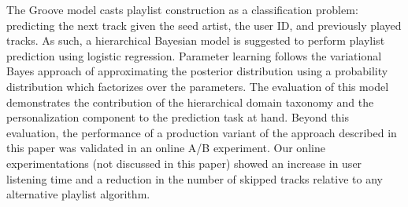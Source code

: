 The Groove model casts playlist construction as a classification problem: predicting the next track given the seed artist, the user ID, and previously played tracks. 
As such, a hierarchical Bayesian model is suggested to perform playlist prediction using logistic regression. 
Parameter learning follows the variational Bayes approach of approximating the posterior distribution using a probability distribution which factorizes over the parameters. 
The evaluation of this model demonstrates the contribution of the hierarchical domain taxonomy and the personalization component to the prediction task at hand. 
Beyond this evaluation, the performance of a production variant of the approach described in this paper was validated in an online A/B experiment. Our online experimentations (not discussed in this paper) showed an increase in user listening time and a reduction in the number of skipped tracks relative to any alternative playlist algorithm. 

